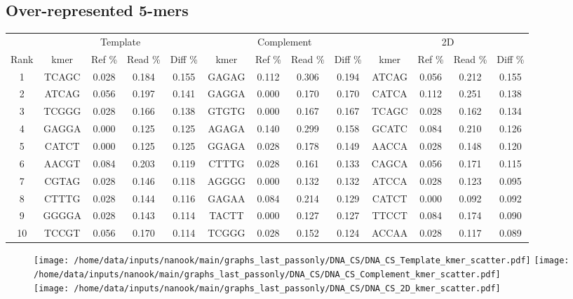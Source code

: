 \documentclass[a4paper,11pt,oneside]{article}
\begin{document}
\subsection*{Over-represented 5-mers}
\vspace{-3mm}
\begin{table}[H]
{\footnotesize
\fontsize{7pt}{9pt}\selectfont
\begin{tabular}{|c|c c c c|c c c c|c c c c|}
\cline{1-13}
 & \multicolumn{4}{c|}{Template} & \multicolumn{4}{c|}{Complement} & \multicolumn{4}{c|}{2D} \\
Rank & kmer & Ref \% & Read \% & Diff \% & kmer & Ref \% & Read \% & Diff \% & kmer & Ref \% & Read \% & Diff \% \\
\cline{1-13}
1 & TCAGC & 0.028 & 0.184 & 0.155 & GAGAG & 0.112 & 0.306 & 0.194 & ATCAG & 0.056 & 0.212 & 0.155 \\
2 & ATCAG & 0.056 & 0.197 & 0.141 & GAGGA & 0.000 & 0.170 & 0.170 & CATCA & 0.112 & 0.251 & 0.138 \\
3 & TCGGG & 0.028 & 0.166 & 0.138 & GTGTG & 0.000 & 0.167 & 0.167 & TCAGC & 0.028 & 0.162 & 0.134 \\
4 & GAGGA & 0.000 & 0.125 & 0.125 & AGAGA & 0.140 & 0.299 & 0.158 & GCATC & 0.084 & 0.210 & 0.126 \\
5 & CATCT & 0.000 & 0.125 & 0.125 & GGAGA & 0.028 & 0.178 & 0.149 & AACCA & 0.028 & 0.148 & 0.120 \\
6 & AACGT & 0.084 & 0.203 & 0.119 & CTTTG & 0.028 & 0.161 & 0.133 & CAGCA & 0.056 & 0.171 & 0.115 \\
7 & CGTAG & 0.028 & 0.146 & 0.118 & AGGGG & 0.000 & 0.132 & 0.132 & ATCCA & 0.028 & 0.123 & 0.095 \\
8 & CTTTG & 0.028 & 0.144 & 0.116 & GAGAA & 0.084 & 0.214 & 0.129 & CATCT & 0.000 & 0.092 & 0.092 \\
9 & GGGGA & 0.028 & 0.143 & 0.114 & TACTT & 0.000 & 0.127 & 0.127 & TTCCT & 0.084 & 0.174 & 0.090 \\
10 & TCCGT & 0.056 & 0.170 & 0.114 & TCGGG & 0.028 & 0.152 & 0.124 & ACCAA & 0.028 & 0.117 & 0.089 \\
\cline{1-13}
\end{tabular}
}
\end{table}
\vspace{-8mm}
\begin{figure}[H]
\centering
\texttt{[image: /home/data/inputs/nanook/main/graphs\_last\_passonly/DNA\_CS/DNA\_CS\_Template\_kmer\_scatter.pdf]} 
\texttt{[image: /home/data/inputs/nanook/main/graphs\_last\_passonly/DNA\_CS/DNA\_CS\_Complement\_kmer\_scatter.pdf]} \\
\texttt{[image: /home/data/inputs/nanook/main/graphs\_last\_passonly/DNA\_CS/DNA\_CS\_2D\_kmer\_scatter.pdf]} \\
\end{figure}
\end{document}
